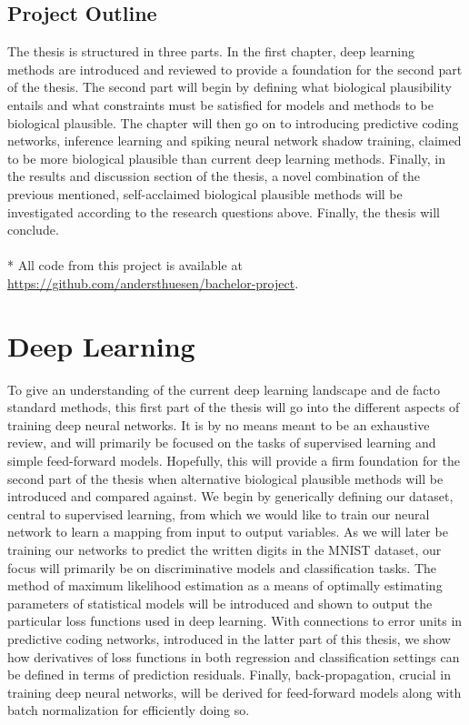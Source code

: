 \documentclass[a4paper,11pt]{article} %
\begin{document}
\subsection{Project Outline}
The thesis is structured in three parts. In the first chapter, deep learning methods are introduced and reviewed to provide a foundation for the second part of the thesis. The second part will begin by defining what biological plausibility entails and what constraints must be satisfied for models and methods to be biological plausible. The chapter will then go on to introducing predictive coding networks, inference learning and spiking neural network shadow training, claimed to be more biological plausible than current deep learning methods. Finally, in the results and discussion section of the thesis, a novel combination of the previous mentioned, self-acclaimed biological plausible methods will be investigated according to the research questions above. Finally, the thesis will conclude. \\
\\*
All code from this project is available at \href{https://github.com/andersthuesen/bachelor-project}{https://github.com/andersthuesen/bachelor-project}.

\newpage

\section{Deep Learning}
To give an understanding of the current deep learning landscape and de facto standard methods, this first part of the thesis will go into the different aspects of training deep neural networks. It is by no means meant to be an exhaustive review, and will primarily be focused on the tasks of supervised learning and simple feed-forward models. Hopefully, this will provide a firm foundation for the second part of the thesis when alternative biological plausible methods will be introduced and compared against. We begin by generically defining our dataset, central to supervised learning, from which we would like to train our neural network to learn a mapping from input to output variables. As we will later be training our networks to predict the written digits in the MNIST dataset, our focus will primarily be on discriminative models and classification tasks. The method of maximum likelihood estimation as a means of optimally estimating parameters of statistical models will be introduced and shown to output the particular loss functions used in deep learning. With connections to error units in predictive coding networks, introduced in the latter part of this thesis, we show how derivatives of loss functions in both regression and classification settings can be defined in terms of prediction residuals. Finally, back-propagation, crucial in training deep neural networks, will be derived for feed-forward models along with batch normalization for efficiently doing so.
\end{document}
